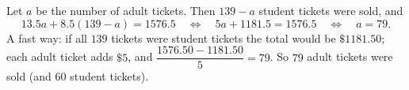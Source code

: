 Let $a$ be the number of adult tickets. Then $139-a$ student tickets were sold, and
\[
13.5a+8.5(139-a)=1576.5\quad\Longleftrightarrow\quad 5a+1181.5=1576.5\quad\Longleftrightarrow\quad a=79 .
\]
A fast way: if all $139$ tickets were student tickets the total would be $\$1181.50$; each adult ticket adds $\$5$, and $\dfrac{1576.50-1181.50}{5}=79$. So $\boxed{79}$ adult tickets were sold (and $60$ student tickets).

